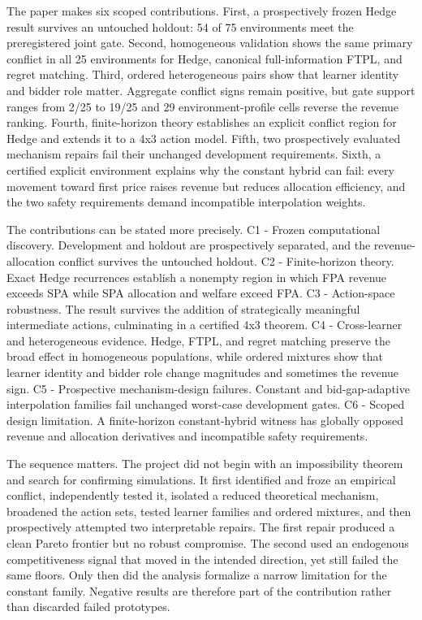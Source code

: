 \documentclass[11pt]{article}
\begin{document}
The paper makes six scoped contributions. First, a prospectively frozen Hedge result survives an untouched holdout: 54 of 75 environments meet the preregistered joint gate. Second, homogeneous validation shows the same primary conflict in all 25 environments for Hedge, canonical full-information FTPL, and regret matching. Third, ordered heterogeneous pairs show that learner identity and bidder role matter. Aggregate conflict signs remain positive, but gate support ranges from 2/25 to 19/25 and 29 environment-profile cells reverse the revenue ranking. Fourth, finite-horizon theory establishes an explicit conflict region for Hedge and extends it to a 4x3 action model. Fifth, two prospectively evaluated mechanism repairs fail their unchanged development requirements. Sixth, a certified explicit environment explains why the constant hybrid can fail: every movement toward first price raises revenue but reduces allocation efficiency, and the two safety requirements demand incompatible interpolation weights.

The contributions can be stated more precisely. C1 - Frozen computational discovery. Development and holdout are prospectively separated, and the revenue-allocation conflict survives the untouched holdout. C2 - Finite-horizon theory. Exact Hedge recurrences establish a nonempty region in which FPA revenue exceeds SPA while SPA allocation and welfare exceed FPA. C3 - Action-space robustness. The result survives the addition of strategically meaningful intermediate actions, culminating in a certified 4x3 theorem. C4 - Cross-learner and heterogeneous evidence. Hedge, FTPL, and regret matching preserve the broad effect in homogeneous populations, while ordered mixtures show that learner identity and bidder role change magnitudes and sometimes the revenue sign. C5 - Prospective mechanism-design failures. Constant and bid-gap-adaptive interpolation families fail unchanged worst-case development gates. C6 - Scoped design limitation. A finite-horizon constant-hybrid witness has globally opposed revenue and allocation derivatives and incompatible safety requirements.

The sequence matters. The project did not begin with an impossibility theorem and search for confirming simulations. It first identified and froze an empirical conflict, independently tested it, isolated a reduced theoretical mechanism, broadened the action sets, tested learner families and ordered mixtures, and then prospectively attempted two interpretable repairs. The first repair produced a clean Pareto frontier but no robust compromise. The second used an endogenous competitiveness signal that moved in the intended direction, yet still failed the same floors. Only then did the analysis formalize a narrow limitation for the constant family. Negative results are therefore part of the contribution rather than discarded failed prototypes.
\end{document}
